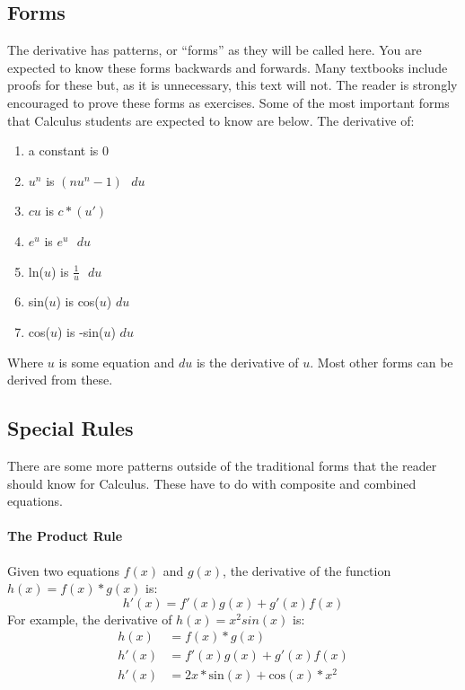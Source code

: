 \documentclass[../main.tex]{subfiles}
\begin{document}
\subsection{Forms}
\par The derivative has patterns, or ``forms'' as they will be called here. You are expected to know these forms backwards and forwards. Many textbooks include proofs for these but, as it is unnecessary, this text will not. The reader is strongly encouraged to prove these forms as exercises. Some of the most important forms that Calculus students are expected to know are below. The derivative of:
\begin{enumerate}
    \item a constant is 0
    \item $u^n$ is $(nu^n-1)\text{ } du$
    \item $cu$ is $c*(u')$
    \item $e^u$ is $e^u\text{ } du$
    \item ln($u$) is $\frac{1}{u}\text{ }du$
    \item sin($u$) is cos($u$) $du$
    \item cos($u$) is -sin($u$) $du$
\end{enumerate}
Where $u$ is some equation and $du$ is the derivative of $u$. Most other forms can be derived from these.
\subsection{Special Rules}
\par There are some more patterns outside of the traditional forms that the reader should know for Calculus. These have to do with composite and combined equations.
\paragraph{The Product Rule} Given two equations $f(x)$ and $g(x)$, the derivative of the function $h(x)=f(x)*g(x)$ is: $$h'(x)=f'(x)g(x)+g'(x)f(x)$$ For example, the derivative of $h(x)=x^2sin(x)$ is: 
\begin{equation}
\begin{split}
h(x)&=f(x)*g(x) \\
h'(x)&=f'(x)g(x)+g'(x)f(x) \\
h'(x) &= 2x*\text{sin}(x)+\text{cos}(x)*x^2
\end{split}
\end{equation}
\end{document}
